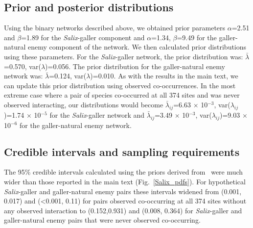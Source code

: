 \documentclass[12pt]{article}
\begin{document}

      \clearpage


    \subsection*{Prior and posterior distributions}

      Using the binary networks described above, we obtained prior parameters $\alpha$=2.51 and $\beta$=1.89 for the \emph{Salix}-galler component and $\alpha$=1.34, $\beta$=9.49 for the galler-natural enemy component of the network. We then calculated prior distributions using these parameters. For the \emph{Salix}-galler network, the prior distribution was: $\bar\lambda$=0.570, var($\lambda$)=0.056. The prior distribution for the galler-natural enemy network was: $\bar\lambda$=0.124, var($\lambda$)=0.010. As with the results in the main text, we can update this prior distribution using observed co-occurrences. In the most extreme case where a pair of species co-occurred at all 374 sites and was never observed interacting, our distributions would become 
      $\bar\lambda_{ij}$=6.63 $\times$ 10$^{-3}$, var($\lambda_{ij}$)=1.74 $\times$ 10$^{-5}$ for the \emph{Salix}-galler network and 
      $\bar\lambda_{ij}$=3.49 $\times$ 10$^{-3}$, var($\lambda_{ij}$)=9.03 $\times$ 10$^{-6}$ for the galler-natural enemy network. 

    \subsection*{Credible intervals and sampling requirements}

      The 95\% credible intervals calculated using the priors derived from~\citet{Barbour2016} were much wider than those reported in the main text (Fig.~\ref{Salix_pdfs}). For hypothetical \emph{Salix}-galler and galler-natural enemy pairs these intervals widened from (0.001, 0.017) and (\textless0.001, 0.11) for pairs observed co-occurring at all 374 sites without any observed interaction to (0.152,0.931) and (0.008, 0.364) for \emph{Salix}-galler and galler-natural enemy pairs that were never observed co-occurring.
\end{document}
